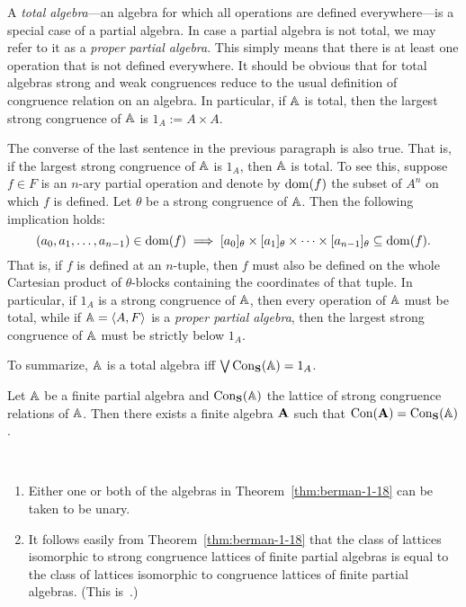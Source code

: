 A \emph{total algebra}---an algebra for which all operations are defined everywhere---is
a special case of a partial algebra. In case a partial algebra is not total,
we may refer to it as a \emph{proper partial algebra}.
This simply means that there is at least one operation that is not defined everywhere.
It should be obvious that for total algebras strong and weak congruences reduce to the usual
definition of congruence relation on an algebra.
In particular, if $\mathbb{A}$ is total, then the largest strong congruence of $\mathbb{A}$ is $1_A := A\times A$.

The converse of the last sentence in the previous paragraph is also true.
That is, if the largest strong congruence of $\mathbb{A}$ is $1_A$, then $\mathbb{A}$ is total.
To see this, suppose $f \in F$ is an $n$-ary partial operation and 
denote by $\operatorname{dom}(f)$ the subset of $A^n$ on which $f$ is defined.
Let $\theta$ be a strong congruence of $\mathbb{A}$.
Then the following implication holds:
\[ (a_0, a_1, \dots, a_{n-1})\in \operatorname{dom}(f) \;  \Longrightarrow \;
   [a_0]_\theta \times [a_1]_\theta \times \cdots \times [a_{n-1}]_\theta \subseteq \operatorname{dom}(f).
   \]
That is, if $f$ is defined at an $n$-tuple,
then $f$ must also be defined on the whole Cartesian product of $\theta$-blocks containing the
coordinates of that tuple.
In particular, if $1_A$ is a strong congruence of $\mathbb{A}$, then every operation of
$\mathbb{A}$ must be total, while if $\mathbb{A} = \langle A, F\rangle$ is a \emph{proper partial algebra},
then the largest strong congruence of $\mathbb{A}$
must be strictly below $1_A$.

To summarize, $\mathbb{A}$ is a total algebra iff $\bigvee \operatorname{Con_{\mathbf{S}}}(\mathbb{A}) = 1_A$.

\begin{theorem}
  \label{thm:berman-1-18}
  Let $\mathbb{A}$ be a finite partial algebra and $\operatorname{Con_{\mathbf{S}}}(\mathbb{A})$ the lattice of strong
  congruence relations of $\mathbb{A}$.  Then there exists a finite algebra $\mathbf{A}$
  such that $\operatorname{Con}(\mathbf{A}) = \operatorname{Con_{\mathbf{S}}}(\mathbb{A})$.
\end{theorem}
\begin{remarks}\
  \begin{enumerate}
  \item  Either one or both of the algebras in Theorem~\ref{thm:berman-1-18} can be
    taken to be unary.
  \item It follows easily from Theorem~\ref{thm:berman-1-18} that the class
    of lattices isomorphic to strong congruence lattices of finite
    partial algebras is equal to the class of lattices isomorphic to
    congruence lattices of finite partial algebras.
    (This is~\cite[Thm~1.19]{MR2619731}.)
  \end{enumerate}
\end{remarks}

